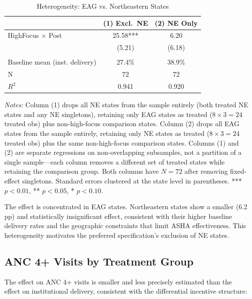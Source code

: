 \documentclass[12pt]{article}
\begin{document}
\begin{table}[H]
\centering
\caption{Heterogeneity: EAG vs. Northeastern States}
\label{tab:eag_ne}
\begin{threeparttable}
\begin{tabular}{lcc}
\toprule
 & (1) Excl.\ NE & (2) NE Only \\
\midrule
HighFocus $\times$ Post & 25.58*** & 6.20 \\
 & (5.21) & (6.18) \\
\\
Baseline mean (inst. delivery) & 27.4\% & 38.9\% \\
N & 72 & 72 \\
$R^2$ & 0.941 & 0.920 \\
\bottomrule
\end{tabular}
\begin{tablenotes}[flushleft]
\small
\item \textit{Notes:} Column (1) drops all NE states from the sample entirely (both treated NE states and any NE singletons), retaining only EAG states as treated ($8 \times 3 = 24$ treated obs) plus non-high-focus comparison states. Column (2) drops all EAG states from the sample entirely, retaining only NE states as treated ($8 \times 3 = 24$ treated obs) plus the same non-high-focus comparison states. Columns (1) and (2) are separate regressions on non-overlapping subsamples, not a partition of a single sample---each column removes a different set of treated states while retaining the comparison group. Both columns have $N=72$ after removing fixed-effect singletons. Standard errors clustered at the state level in parentheses. *** $p<0.01$, ** $p<0.05$, * $p<0.10$.
\end{tablenotes}
\end{threeparttable}
\end{table}

The effect is concentrated in EAG states. Northeastern states show a smaller (6.2 pp) and statistically insignificant effect, consistent with their higher baseline delivery rates and the geographic constraints that limit ASHA effectiveness. This heterogeneity motivates the preferred specification's exclusion of NE states.

\subsection{ANC 4+ Visits by Treatment Group}

The effect on ANC 4+ visits is smaller and less precisely estimated than the effect on institutional delivery, consistent with the differential incentive structure:
\end{document}

